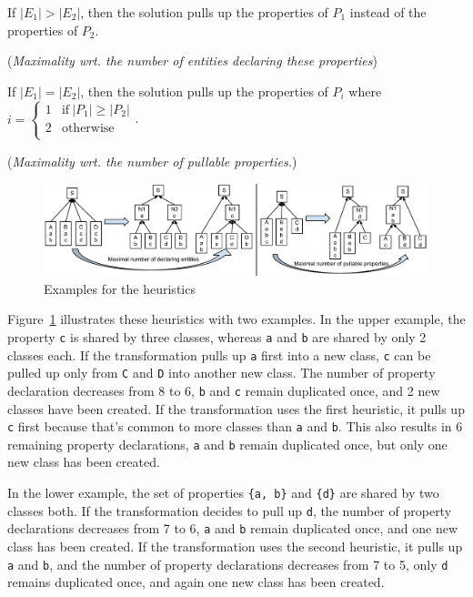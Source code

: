 \documentclass[submission]{eptcs}
\begin{document}
\begin{compactenum}
\item If $|E_1| > |E_2|$, then the solution pulls up the properties of $P_1$
  instead of the properties of $P_2$.

  (\emph{Maximality wrt. the number of entities declaring these properties})
\item If $|E_1| = |E_2|$, then the solution pulls up the properties of $P_i$
  where~$i = \left\{\begin{array}{ll}1 & \text{if}~|P_1| \geq |P_2|\\2 &
      \text{otherwise}\\ \end{array}\right.$.

  (\emph{Maximality wrt. the number of pullable properties.})
\end{compactenum}

\begin{figure}[h!tb]
  \centering
  \includegraphics[width=\linewidth]{heuristics-example}
  \caption{Examples for the heuristics}
  \label{fig:heuristics-example}
\end{figure}

Figure~\ref{fig:heuristics-example} illustrates these heuristics with two
examples.  In the upper example, the property \verb|c| is shared by three
classes, whereas \verb|a| and \verb|b| are shared by only 2 classes each.  If
the transformation pulls up \verb|a| first into a new class, \verb|c| can be
pulled up only from \verb|C| and \verb|D| into another new class.  The number
of property declaration decreases from 8 to 6, \verb|b| and \verb|c| remain
duplicated once, and 2 new classes have been created.  If the transformation
uses the first heuristic, it pulls up \verb|c| first because that's common to
more classes than \verb|a| and \verb|b|.  This also results in 6 remaining
property declarations, \verb|a| and \verb|b| remain duplicated once, but only
one new class has been created.

In the lower example, the set of properties \verb|{a, b}| and \verb|{d}| are
shared by two classes both.  If the transformation decides to pull up \verb|d|,
the number of property declarations decreases from 7 to 6, \verb|a| and
\verb|b| remain duplicated once, and one new class has been created.  If the
transformation uses the second heuristic, it pulls up \verb|a| and \verb|b|,
and the number of property declarations decreases from 7 to 5, only \verb|d|
remains duplicated once, and again one new class has been created.
\end{document}
